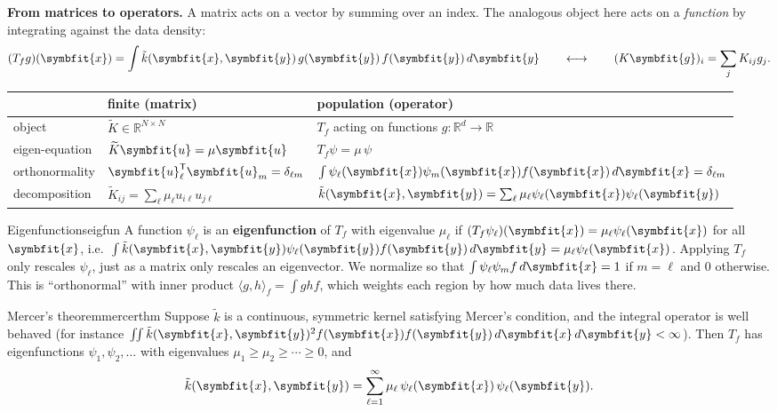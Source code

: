 \documentclass[11pt]{article}
\newcommand{\bm}[1]{\symbfit{#1}}
\newcommand{\R}{\mathbb{R}}
\newcommand{\vx}{\bm{x}}
\newcommand{\vy}{\bm{y}}
\newcommand{\vu}{\bm{u}}
\newcommand{\T}{^{\mathsf T}}
\begin{document}
\textbf{From matrices to operators.} A matrix acts on a vector by
summing over an index. The analogous object here acts on a \emph{function} by integrating
against the data density:
\[
(T_fg)(\vx)=\int\tilde k(\vx,\vy)\,g(\vy)\,f(\vy)\,d\vy
\qquad\longleftrightarrow\qquad
(K\bm g)_i=\sum_jK_{ij}g_j .
\]
\begin{center}
\renewcommand{\arraystretch}{1.25}
\begin{tabular}{lll}
\toprule
& finite (matrix) & population (operator) \\
\midrule
object & $\widetilde K\in\R^{N\times N}$ & $T_f$ acting on functions $g:\R^d\to\R$ \\
eigen-equation & $\widetilde K\vu=\mu\vu$ & $T_f\psi=\mu\,\psi$ \\
orthonormality & $\vu_\ell\T\vu_m=\delta_{\ell m}$ & $\int\psi_\ell(\vx)\psi_m(\vx)f(\vx)\,d\vx=\delta_{\ell m}$ \\
decomposition & $\widetilde K_{ij}=\sum_\ell\mu_\ell u_{i\ell}u_{j\ell}$ & $\tilde k(\vx,\vy)=\sum_\ell\mu_\ell\psi_\ell(\vx)\psi_\ell(\vy)$ \\
\bottomrule
\end{tabular}
\end{center}

\begin{definition}{Eigenfunctions}{eigfun}
A function $\psi_\ell$ is an \textbf{eigenfunction} of $T_f$ with eigenvalue $\mu_\ell$ if
$(T_f\psi_\ell)(\vx)=\mu_\ell\psi_\ell(\vx)$ for all $\vx$, i.e.\ $\int\tilde k(\vx,\vy)\psi_\ell(\vy)f(\vy)\,d\vy=\mu_\ell\psi_\ell(\vx)$.
Applying $T_f$ only rescales $\psi_\ell$, just as a matrix only rescales an eigenvector. We normalize so that
$\int\psi_\ell\psi_mf\,d\vx=1$ if $m=\ell$ and $0$ otherwise. This is ``orthonormal'' with
inner product $\langle g,h\rangle_f=\int ghf$, which weights each region by how much data lives there.
\end{definition}

\begin{theorem}{Mercer's theorem}{mercerthm}
Suppose $\tilde k$ is a continuous, symmetric kernel satisfying Mercer's condition, and the
integral operator is well behaved (for instance $\int\!\!\int\tilde k(\vx,\vy)^2f(\vx)f(\vy)\,d\vx\,d\vy<\infty$). Then $T_f$
has eigenfunctions $\psi_1,\psi_2,\dots$ with eigenvalues $\mu_1\ge\mu_2\ge\cdots\ge0$, and
\[
\tilde k(\vx,\vy)=\sum_{\ell=1}^{\infty}\mu_\ell\,\psi_\ell(\vx)\,\psi_\ell(\vy).
\]
\end{theorem}
\end{document}
